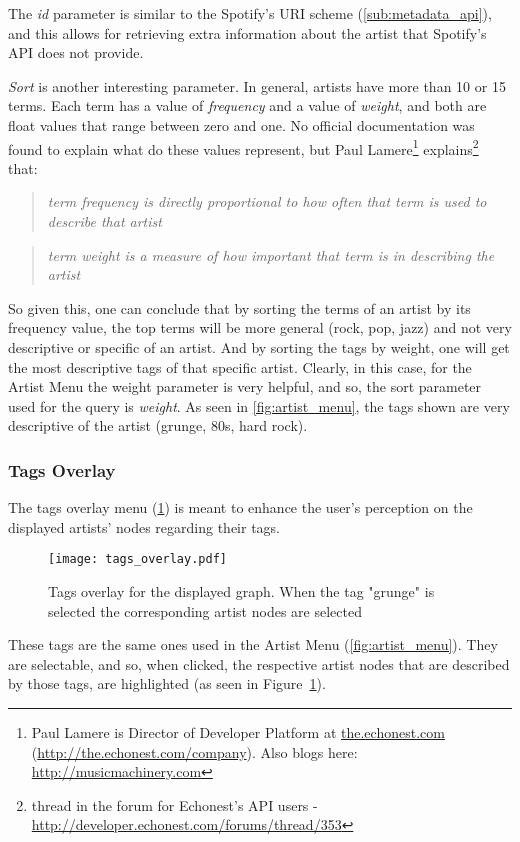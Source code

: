       The \emph{id} parameter is similar to the Spotify's URI scheme (\ref{sub:metadata_api}), and this allows for retrieving extra information about the artist that Spotify's API does not provide.

      \emph{Sort} is another interesting parameter. 
      In general, artists have more than 10 or 15 terms.
      Each term has a value of \emph{frequency} and a value of \emph{weight}, and both are float values that range between zero and one.
      No official documentation was found to explain what do these values represent, but Paul Lamere\footnote{Paul Lamere is Director of Developer Platform at \url{the.echonest.com} (\url{http://the.echonest.com/company}). Also blogs here: \url{http://musicmachinery.com}} explains\footnote{thread in the forum for Echonest's API users - \url{http://developer.echonest.com/forums/thread/353}} that:

      \begin{quote}
      \emph{
        term frequency is directly proportional to how often that term is used to describe that artist
      }
      \end{quote}

      \begin{quote}
      \emph{
        term weight is a measure of how important that term is in describing the artist
      }
      \end{quote}

      So given this, one can conclude that by sorting the terms of an artist by its frequency value, the top terms will be more general (rock, pop, jazz) and not very descriptive or specific of an artist.
      And by sorting the tags by weight, one will get the most descriptive tags of that specific artist.
      Clearly, in this case, for the Artist Menu the weight parameter is very helpful, and so, the sort parameter used for the query is \emph{weight}.
      As seen in \ref{fig:artist_menu}, the tags shown are very descriptive of the artist (grunge, 80s, hard rock).


    \subsubsection{Tags Overlay} %
      \label{ssub:tags_overlay}

      The tags overlay menu (\ref{fig:tags_overlay}) is meant to enhance the user's perception on the displayed artists' nodes regarding their tags.
      \begin{figure}[tb]
        \begin{center}
          \texttt{[image: tags\_overlay.pdf]}
        \end{center}
        \caption{Tags overlay for the displayed graph. When the tag "grunge" is selected the corresponding artist nodes are selected}
        \label{fig:tags_overlay}
      \end{figure}
      These tags are the same ones used in the Artist Menu (\ref{fig:artist_menu}).
      They are selectable, and so, when clicked, the respective artist nodes that are described by those tags, are highlighted (as seen in Figure~\ref{fig:tags_overlay}).

